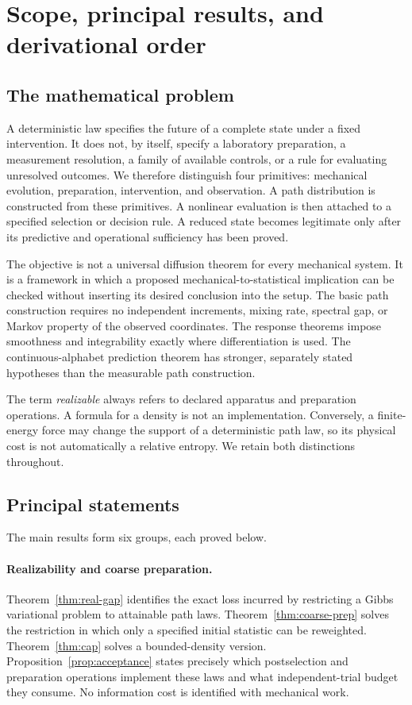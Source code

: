 \section{Scope, principal results, and derivational order}\label{sec:intro}
\subsection{The mathematical problem}
A deterministic law specifies the future of a complete state under a fixed intervention. It does not, by itself, specify a laboratory preparation, a measurement resolution, a family of available controls, or a rule for evaluating unresolved outcomes. We therefore distinguish four primitives: mechanical evolution, preparation, intervention, and observation. A path distribution is constructed from these primitives. A nonlinear evaluation is then attached to a specified selection or decision rule. A reduced state becomes legitimate only after its predictive and operational sufficiency has been proved.

The objective is not a universal diffusion theorem for every mechanical system. It is a framework in which a proposed mechanical-to-statistical implication can be checked without inserting its desired conclusion into the setup. The basic path construction requires no independent increments, mixing rate, spectral gap, or Markov property of the observed coordinates. The response theorems impose smoothness and integrability exactly where differentiation is used. The continuous-alphabet prediction theorem has stronger, separately stated hypotheses than the measurable path construction.

The term \emph{realizable} always refers to declared apparatus and preparation operations. A formula for a density is not an implementation. Conversely, a finite-energy force may change the support of a deterministic path law, so its physical cost is not automatically a relative entropy. We retain both distinctions throughout.

\subsection{Principal statements}
The main results form six groups, each proved below.

\paragraph{Realizability and coarse preparation.}
Theorem~\ref{thm:real-gap} identifies the exact loss incurred by restricting a Gibbs variational problem to attainable path laws. Theorem~\ref{thm:coarse-prep} solves the restriction in which only a specified initial statistic can be reweighted. Theorem~\ref{thm:cap} solves a bounded-density version. Proposition~\ref{prop:acceptance} states precisely which postselection and preparation operations implement these laws and what independent-trial budget they consume. No information cost is identified with mechanical work.

